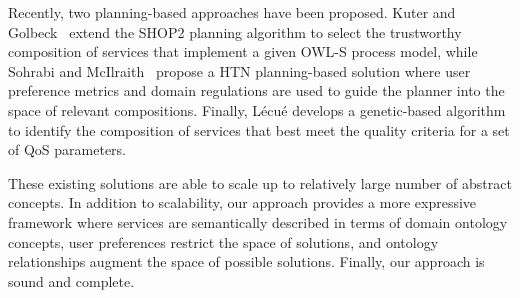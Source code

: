 \documentclass{llncs}
\begin{document}
Recently, two
planning-based approaches have been proposed. Kuter
and Golbeck~\cite{kuterG09} extend the SHOP2 planning algorithm to
select the trustworthy composition of services that implement a given
OWL-S process model, while Sohrabi and McIlraith~\cite{sohrabiM09}
propose a HTN planning-based solution where user preference metrics
and domain regulations are used to guide the planner into the space
of relevant compositions. Finally, L\'ecu\'e \cite{lecue09}  develops
a genetic-based algorithm to identify the composition of services
that best meet the quality criteria for a set of QoS parameters.

These existing solutions are able to scale up to relatively large
number of abstract concepts. In addition to scalability, our approach
provides a more expressive framework where services are semantically
described in terms of domain ontology concepts, user preferences
restrict the space of solutions, and ontology relationships augment
the space of possible solutions. Finally, our approach is sound and
complete.
\end{document}
